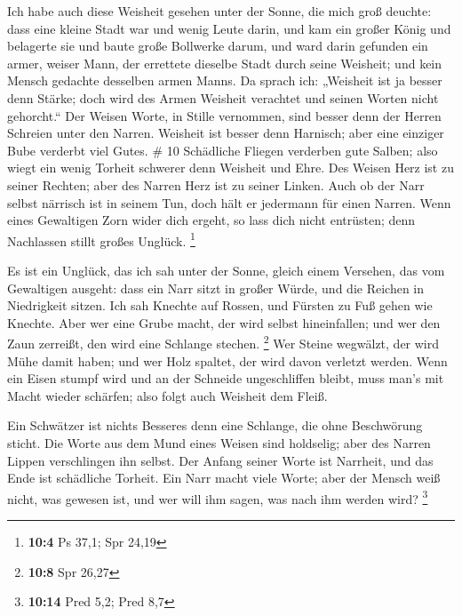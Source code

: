  Ich habe auch diese Weisheit gesehen unter der Sonne,
die mich groß deuchte:  dass eine kleine Stadt war und
wenig Leute darin, und kam ein großer König und belagerte sie und baute
große Bollwerke darum,  und ward darin gefunden ein
armer, weiser Mann, der errettete dieselbe Stadt durch seine Weisheit;
und kein Mensch gedachte desselben armen Manns.  Da
sprach ich: „Weisheit ist ja besser denn Stärke; doch wird des Armen
Weisheit verachtet und seinen Worten nicht gehorcht.`` 
Der Weisen Worte, in Stille vernommen, sind besser denn der Herren
Schreien unter den Narren.  Weisheit ist besser denn
Harnisch; aber eine einziger Bube verderbt viel Gutes. \# 10
 Schädliche Fliegen verderben gute Salben; also wiegt ein
wenig Torheit schwerer denn Weisheit und Ehre.  Des Weisen
Herz ist zu seiner Rechten; aber des Narren Herz ist zu seiner Linken.
 Auch ob der Narr selbst närrisch ist in seinem Tun, doch
hält er jedermann für einen Narren.  Wenn eines Gewaltigen
Zorn wider dich ergeht, so lass dich nicht entrüsten; denn Nachlassen
stillt großes Unglück. \footnote{\textbf{10:4} Ps 37,1; Spr 24,19}

 Es ist ein Unglück, das ich sah unter der Sonne, gleich
einem Versehen, das vom Gewaltigen ausgeht:  dass ein Narr
sitzt in großer Würde, und die Reichen in Niedrigkeit sitzen.
 Ich sah Knechte auf Rossen, und Fürsten zu Fuß gehen wie
Knechte.  Aber wer eine Grube macht, der wird selbst
hineinfallen; und wer den Zaun zerreißt, den wird eine Schlange stechen.
\footnote{\textbf{10:8} Spr 26,27}  Wer Steine wegwälzt,
der wird Mühe damit haben; und wer Holz spaltet, der wird davon verletzt
werden.  Wenn ein Eisen stumpf wird und an der Schneide
ungeschliffen bleibt, muss man's mit Macht wieder schärfen; also folgt
auch Weisheit dem Fleiß.

 Ein Schwätzer ist nichts Besseres denn eine Schlange,
die ohne Beschwörung sticht.  Die Worte aus dem Mund
eines Weisen sind holdselig; aber des Narren Lippen verschlingen ihn
selbst.  Der Anfang seiner Worte ist Narrheit, und das
Ende ist schädliche Torheit.  Ein Narr macht viele Worte;
aber der Mensch weiß nicht, was gewesen ist, und wer will ihm sagen, was
nach ihm werden wird? \footnote{\textbf{10:14} Pred 5,2; Pred 8,7}


